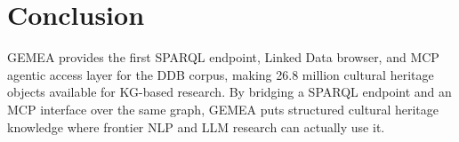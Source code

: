 
\section{Conclusion}
\label{sec:conclusion}

GEMEA provides the first SPARQL endpoint, Linked Data browser, and MCP agentic
access layer for the DDB corpus, making 26.8 million cultural heritage objects
available for KG-based research.
By bridging a SPARQL endpoint and an MCP interface over the same graph, GEMEA
puts structured cultural heritage knowledge where frontier NLP and LLM research
can actually use it.
